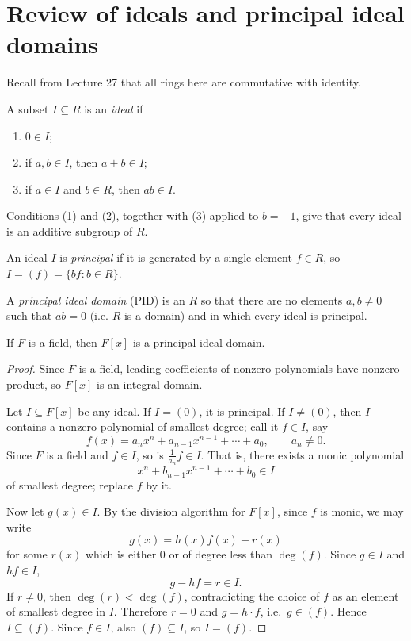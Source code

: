 \documentclass[reqno,11pt]{amsart}
\begin{document}
\raggedbottom
\makelecturetitle

\section{Review of ideals and principal ideal domains}

Recall from Lecture 27 that all rings here are commutative with identity.

\begin{define}[Ideal]
A subset $I\subseteq R$ is an \emph{ideal} if
\begin{enumerate}[label=(\arabic*)]
  \item $0\in I$;
  \item if $a,b\in I$, then $a+b\in I$;
  \item if $a\in I$ and $b\in R$, then $ab\in I$.
\end{enumerate}
\end{define}

Conditions (1) and (2), together with (3) applied to $b=-1$, give
that every ideal is an additive subgroup of $R$.

\begin{define}
An ideal $I$ is \emph{principal} if it is generated by a single
element $f\in R$, so $I=(f)=\{bf:b\in R\}$.
\end{define}

\begin{define}
A \emph{principal ideal domain} (PID) is an $R$ so that there are no elements $a, b \neq 0$ such that $ab=0$ (i.e. $R$ is a domain) and in which
every ideal is principal.
\end{define}

\begin{theorem}
If $F$ is a field, then $F[x]$ is a principal ideal domain.
\end{theorem}

\begin{proof}
Since $F$ is a field, leading coefficients of nonzero polynomials
have nonzero product, so $F[x]$ is an integral domain.

Let $I\subseteq F[x]$ be any ideal. If $I=(0)$, it is principal.
If $I\neq(0)$, then $I$ contains a nonzero polynomial of smallest
degree; call it $f\in I$, say
\[
  f(x)=a_nx^n+a_{n-1}x^{n-1}+\cdots+a_0,\qquad a_n\neq0.
\]
Since $F$ is a field and $f\in I$, so is $\frac1{a_n}f\in I$.
That is, there exists a monic polynomial
\[
  x^n+b_{n-1}x^{n-1}+\cdots+b_0\in I
\]
of smallest degree; replace $f$ by it.

Now let $g(x)\in I$. By the division algorithm for $F[x]$, since $f$
is monic, we may write
\[
  g(x)=h(x)f(x)+r(x)
\]
for some $r(x)$ which is either $0$ or of degree less than
$\deg(f)$. Since $g\in I$ and $hf\in I$,
\[
  g-hf=r\in I.
\]
If $r\neq0$, then $\deg(r)<\deg(f)$, contradicting the choice of $f$
as an element of smallest degree in $I$. Therefore $r=0$ and
$g=h\cdot f$, i.e.\ $g\in(f)$. Hence $I\subseteq(f)$. Since $f\in I$,
also $(f)\subseteq I$, so $I=(f)$.
\end{proof}
\end{document}
